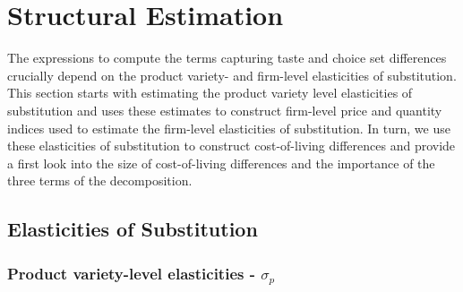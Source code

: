 \section{Structural Estimation}\label{sec:struc_est}
The expressions to compute the terms capturing taste and choice set differences crucially depend on the product variety- and firm-level elasticities of substitution. This section starts with estimating the product variety level elasticities of substitution and uses these estimates to construct firm-level price and quantity indices used to estimate the firm-level elasticities of substitution. In turn, we use these elasticities of substitution to construct cost-of-living differences and provide a first look into the size of cost-of-living differences and the importance of the three terms of the decomposition. 

\subsection{Elasticities of Substitution}
\subsubsection{Product variety-level elasticities - $\sigma_p$}
